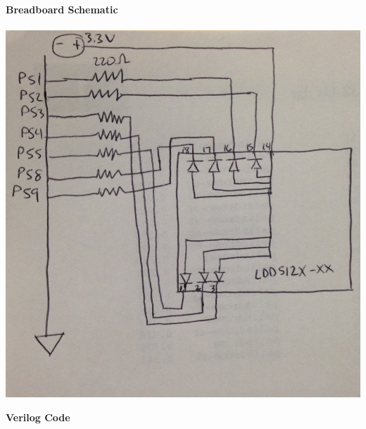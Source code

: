 \documentclass[11pt,letterpaper]{article}
\begin{document}
\textbf{Breadboard Schematic}\\\\
\includegraphics[scale=0.2]{schematic.jpg}

\pagebreak

\textbf{Verilog Code}\\\\
\lstset{language=Verilog}

\end{document}
